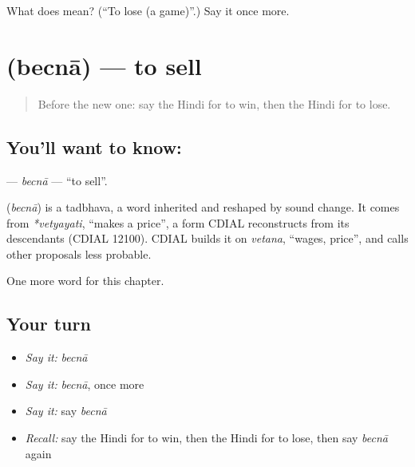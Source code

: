 \begin{tcolorbox}[breakable,colback=teal!4,colframe=teal!35!black,title={Before you move on}]
What does  mean? (\textquotedblleft{}To lose (a game)\textquotedblright{}.) Say it once more.
\end{tcolorbox}
\section[\texorpdfstring{\hi{बेचना} (becnā)}{बेचना (becnā)}]{ (becnā) — to sell}

\label{lesson:HI-C163-becna}



\begin{quote}
Before the new one: say the Hindi for to win, then the Hindi for to lose.
\end{quote}

\subsection*{You'll want to know: }
\textbf{} — \emph{becnā} — \textquotedblleft{}to sell\textquotedblright{}.

\begin{cousinweb}
\textbf{} (\emph{becnā}) is a tadbhava, a word inherited and reshaped by sound change. It comes from \emph{*vetyayati}, \textquotedblleft{}makes a price\textquotedblright{}, a form CDIAL reconstructs from its descendants (CDIAL 12100). CDIAL builds it on \emph{vetana}, \textquotedblleft{}wages, price\textquotedblright{}, and calls other proposals less probable.
\end{cousinweb}

\begin{grammarlens}[title={What you've built}]
One more word for this chapter.
\end{grammarlens}

\subsection*{Your turn}
\begin{itemize}
\raggedright
  \item \emph{Say it:} \emph{becnā}
  \item \emph{Say it:} \emph{becnā}, once more
  \item \emph{Say it:} say \emph{becnā}
  \item \emph{Recall:} say the Hindi for to win, then the Hindi for to lose, then say \emph{becnā} again
\end{itemize}

